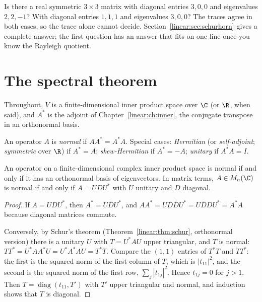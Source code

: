 \begin{think}
Is there a real symmetric $3\times3$ matrix with diagonal entries $3,0,0$ and eigenvalues $2,2,-1$? With diagonal entries
$1,1,1$ and eigenvalues $3,0,0$? The traces agree in both cases, so the trace alone cannot decide. Section~\ref{linear:sec:schurhorn}
gives a complete answer; the first question has an answer that fits on one line once you know the Rayleigh quotient.
\end{think}

\section{The spectral theorem}

Throughout, $V$ is a finite-dimensional inner product space over $\C$ (or $\R$, when said), and $A^*$ is the adjoint of
Chapter~\ref{linear:ch:inner}, the conjugate transpose in an orthonormal basis.

\begin{definition}\label{linear:def:normal}
An operator $A$ is \emph{normal} if $AA^*=A^*A$. Special cases: \emph{Hermitian} (or \emph{self-adjoint}; \emph{symmetric}
over $\R$) if $A^*=A$; \emph{skew-Hermitian} if $A^*=-A$; \emph{unitary} if $A^*A=I$.
\end{definition}

\begin{theorem}\label{linear:thm:spectral}
An operator on a finite-dimensional complex inner product space is normal if and only if it has an orthonormal basis of
eigenvectors. In matrix terms, $A\in M_n(\C)$ is normal if and only if $A=UDU^*$ with $U$ unitary and $D$ diagonal.
\end{theorem}
\begin{proof}
If $A=UDU^*$, then $A^*=U\bar DU^*$, and $AA^*=U D\bar DU^*=U\bar DDU^*=A^*A$ because diagonal matrices commute.

Conversely, by Schur's theorem (Theorem~\ref{linear:thm:schur}, orthonormal version) there is a unitary $U$ with $T=U^*AU$ upper
triangular, and $T$ is normal: $TT^*=U^*AA^*U=U^*A^*AU=T^*T$. Compare the $(1,1)$ entries of $T^*T$ and $TT^*$: the first is
the squared norm of the first column of $T$, which is $|t_{11}|^2$, and the second is the squared norm of the first row,
$\sum_j|t_{1j}|^2$. Hence $t_{1j}=0$ for $j>1$. Then $T=\operatorname{diag}(t_{11},T')$ with $T'$ upper triangular and
normal, and induction shows that $T$ is diagonal.
\end{proof}

